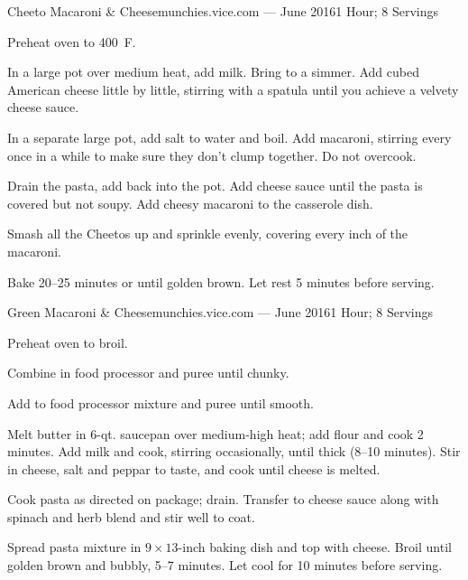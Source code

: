 \documentclass{article}
\begin{document}
\begin{recipe}{Cheeto Macaroni \& Cheese}{munchies.vice.com --- June 2016}{1 Hour; 8 Servings}

   \newstep
   Preheat oven to 400\ \0F.

   In a large pot over medium heat, add milk. Bring to a simmer. Add cubed
   American cheese little by little, stirring with a spatula until you achieve a
   velvety cheese sauce.

   In a separate large pot, add salt to water and boil. Add macaroni, stirring
   every once in a while to make sure they don’t clump together. Do not
   overcook.

   \newstep
   Drain the pasta, add back into the pot. Add cheese sauce until the pasta is
   covered but not soupy. Add cheesy macaroni to the casserole dish.

   Smash all the Cheetos up and sprinkle evenly, covering every inch of the
   macaroni.    

   \newstep
   Bake 20--25 minutes or until golden brown.  Let rest 5 minutes before
   serving.

\end{recipe}

\begin{recipe}{Green Macaroni \& Cheese}{munchies.vice.com --- June 2016}{1 Hour; 8 Servings}

   \newstep
   Preheat oven to broil.

   Combine in food processor and puree until chunky.

   Add to food processor mixture and puree until smooth.

   Melt butter in 6-qt. saucepan over medium-high heat; add flour and cook 2
   minutes. Add milk and cook, stirring occasionally, until thick (8--10
   minutes).  Stir in cheese, salt and peppar to taste, and cook until cheese is
   melted.

   Cook pasta as directed on package; drain.  Transfer to cheese sauce along
   with spinach and herb blend and stir well to coat. 

   Spread pasta mixture in $9\times13$-inch baking dish and top with
   cheese.  Broil until golden brown and bubbly, 5--7 minutes.  Let cool for 10
   minutes before serving.

\end{recipe}
\end{document}
